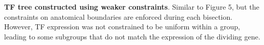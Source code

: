 \textbf{TF tree constructed using weaker constraints}. 
Similar to Figure 5, but the constraints on anatomical boundaries are enforced during each bisection. However, TF expression was not constrained to be uniform within a group, leading to some subgroups that do not match the expression of the dividing gene.
